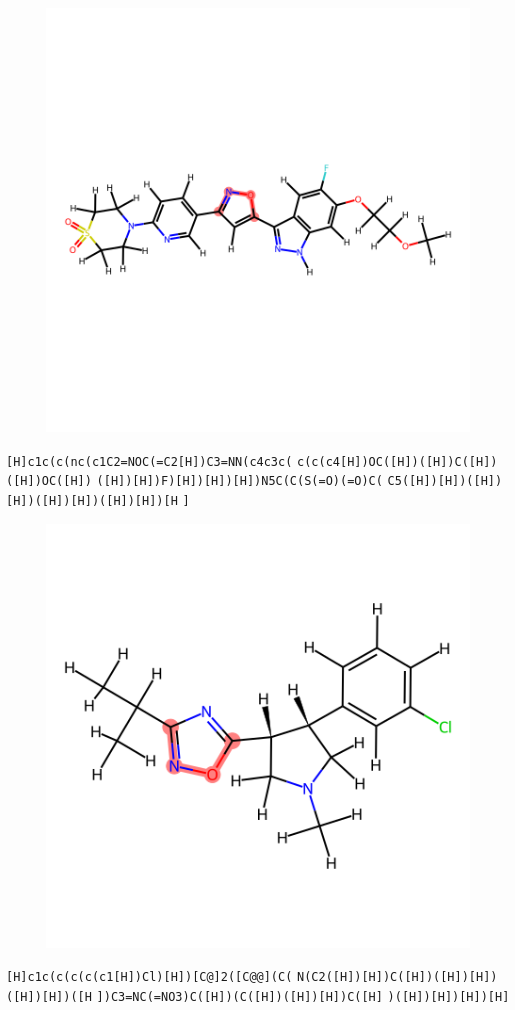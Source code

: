 \documentclass{article}
\begin{document}
\begin{figure}[ht]
\centering
    \includegraphics{mol224.png}
\end{figure}
\verb|[H]c1c(c(nc(c1C2=NOC(=C2[H])C3=NN(c4c3c(| \verb|c(c(c4[H])OC([H])([H])C([H])([H])OC([H])| \verb|([H])[H])F)[H])[H])[H])N5C(C(S(=O)(=O)C(| \verb|C5([H])[H])([H])[H])([H])[H])([H])[H])[H| \verb|]|

\begin{figure}[ht]
\centering
    \includegraphics{mol225.png}
\end{figure}
\verb|[H]c1c(c(c(c(c1[H])Cl)[H])[C@]2([C@@](C(| \verb|N(C2([H])[H])C([H])([H])[H])([H])[H])([H| \verb|])C3=NC(=NO3)C([H])(C([H])([H])[H])C([H]| \verb|)([H])[H])[H])[H]|
\end{document}
